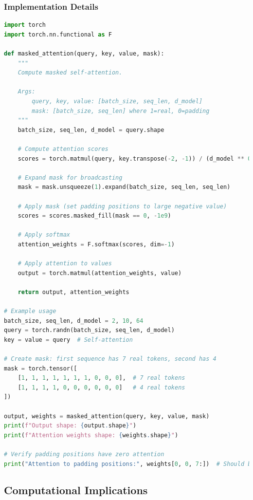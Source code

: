 \subsubsection{Implementation Details}
\begin{lstlisting}[language=Python, caption=Attention Masking]
import torch
import torch.nn.functional as F

def masked_attention(query, key, value, mask):
    """
    Compute masked self-attention.
    
    Args:
        query, key, value: [batch_size, seq_len, d_model]
        mask: [batch_size, seq_len] where 1=real, 0=padding
    """
    batch_size, seq_len, d_model = query.shape
    
    # Compute attention scores
    scores = torch.matmul(query, key.transpose(-2, -1)) / (d_model ** 0.5)
    
    # Expand mask for broadcasting
    mask = mask.unsqueeze(1).expand(batch_size, seq_len, seq_len)
    
    # Apply mask (set padding positions to large negative value)
    scores = scores.masked_fill(mask == 0, -1e9)
    
    # Apply softmax
    attention_weights = F.softmax(scores, dim=-1)
    
    # Apply attention to values
    output = torch.matmul(attention_weights, value)
    
    return output, attention_weights

# Example usage
batch_size, seq_len, d_model = 2, 10, 64
query = torch.randn(batch_size, seq_len, d_model)
key = value = query  # Self-attention

# Create mask: first sequence has 7 real tokens, second has 4
mask = torch.tensor([
    [1, 1, 1, 1, 1, 1, 1, 0, 0, 0],  # 7 real tokens
    [1, 1, 1, 1, 0, 0, 0, 0, 0, 0]   # 4 real tokens
])

output, weights = masked_attention(query, key, value, mask)
print(f"Output shape: {output.shape}")
print(f"Attention weights shape: {weights.shape}")

# Verify padding positions have zero attention
print("Attention to padding positions:", weights[0, 0, 7:])  # Should be ~0
\end{lstlisting}

\subsection{Computational Implications}

